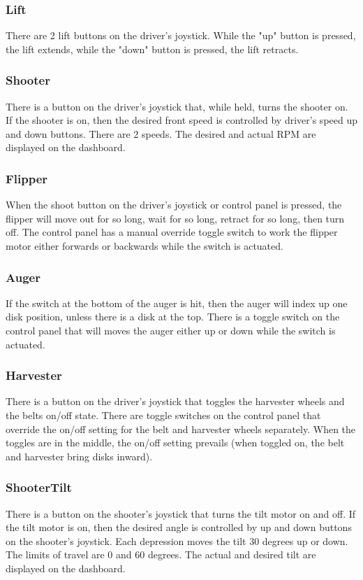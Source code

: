 \documentclass[]{article}
\begin{document}
\subsubsection{Lift}
There are 2 lift buttons on the driver's joystick.
While the "up" button is pressed, the lift extends, while the "down" button is pressed, the lift retracts.

\subsubsection{Shooter}
There is a button on the driver's joystick that, while held, turns the shooter on.
If the shooter is on, then the desired front speed is controlled by driver's speed up and down buttons. There are 2 speeds.
The desired and actual RPM are displayed on the dashboard.

\subsubsection{Flipper}
When the shoot button on the driver's joystick or control panel is pressed, the flipper will move out for so long, wait for so long, retract for so long, then turn off.
The control panel has a manual override toggle switch to work the flipper motor either forwards or backwards while the switch is actuated.

\subsubsection{Auger}
If the switch at the bottom of the auger is hit, then the auger will index up one disk position, unless there is a disk at the top.
There is a toggle switch on the control panel that will moves the auger either up or down while the switch is actuated.

\subsubsection{Harvester}
There is a button on the driver's joystick that toggles the harvester wheels and the belts on/off state.
There are toggle switches on the control panel that override the on/off setting for the belt and harvester wheels separately.
When the toggles are in the middle, the on/off setting prevails (when toggled on, the belt and harvester bring disks inward).

\subsubsection{ShooterTilt}
There is a button on the shooter's joystick that turns the tilt motor on and off.
If the tilt motor is on, then the desired angle is controlled by up and down buttons on the shooter's joystick.
Each depression moves the tilt 30 degrees up or down. 
The limits of travel are 0 and 60 degrees.
The actual and desired tilt are displayed on the dashboard.
\end{document}
